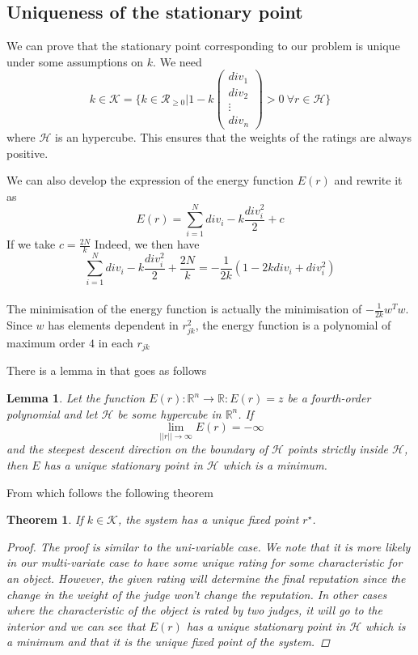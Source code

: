 \documentclass[12pt,a4paper]{article}
\newtheorem{lemma}{Lemma}
\newtheorem{theorem}{Theorem}
\begin{document}
\subsection{Uniqueness of the stationary point}

We can prove that the stationary point corresponding to our problem is unique under some assumptions on $k$.
We need $$k\in \mathcal{K} = \{k\in \mathcal{R}_{\geq 0} | 1 - k \begin{pmatrix} div_1 \\ div_2 \\ \vdots \\ div_n \end{pmatrix} >0 \: \forall r \in \mathcal{H} \}$$
where $\mathcal{H}$ is an hypercube. This ensures that the weights of the ratings are always positive. 

We can also develop the expression of the energy function $E(r)$ and rewrite it as
$$ E(r) = \sum_{i=1}^N div_i - k \frac{div_i^2}{2} + c$$
If we take $c = \frac{2N}{k}$
Indeed, we then have $$ \sum_{i=1}^N div_i - k \frac{div_i^2}{2} + \frac{2N}{k}= -\frac{1}{2k}(1 - 2kdiv_i + div_i^2)$$
\\
The minimisation of the energy function is actually the minimisation of $  -\frac{1}{2k} w^Tw $. Since $w$ has elements dependent in $r_{jk}^2$, the energy function is a polynomial of maximum order $4$ in each $r_{jk}$

There is a lemma in \cite{Cristo1} that goes as follows
\begin{lemma}
Let the function $E(r) : \mathbb{R}^n \rightarrow \mathbb{R} : E(r) = z $ be a fourth-order polynomial and let $\mathcal{H}$ be some hypercube in $\mathbb{R}^n$. If 
$$\lim_{||r||\rightarrow \infty} E(r) = - \infty $$
and the steepest descent direction on the boundary of $\mathcal{H}$ points strictly inside $\mathcal{H}$, then $E$ has a unique stationary point in $\mathcal{H}$ which is a minimum.
\end{lemma}
From which follows the following theorem
\begin{theorem}
If $k \in \mathcal{K}$, the system has a unique fixed point $r^{\star}$.
\begin{proof}
The proof is similar to the uni-variable case. We note that it is more likely in our multi-variate case to have some unique rating for some characteristic for an object. However, the given rating will determine the final reputation since the change in the weight of the judge won't change the reputation. In other cases where the characteristic of the object is rated by two judges, it will go to the interior and we can see that $E(r)$ has a unique stationary point in $\mathcal{H}$ which is a minimum and that it is the unique fixed point of the system.
\end{proof}
\end{theorem}
\end{document}
